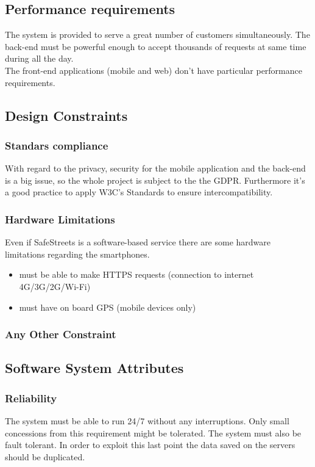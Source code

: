 \documentclass{article}
\begin{document}
\newpage
\subsection{Performance requirements}
The system is provided to serve a great number of customers simultaneously. The
back-end must be powerful enough to accept thousands of requests at same time
during all the day.\\
The front-end applications (mobile and web) don't have particular performance
requirements.
\subsection{Design Constraints}
\subsubsection{Standars compliance}
With regard to the privacy, security for the mobile application and the back-end
is a big issue, so the whole project is subject to the the GDPR. Furthermore
it's a good practice to apply W3C's Standards to ensure intercompatibility.
\subsubsection{Hardware Limitations}
Even if SafeStreets is a software-based service there are some hardware
limitations regarding the smartphones.
\begin{itemize}
    \item must be able to make HTTPS requests (connection to internet
    4G/3G/2G/Wi-Fi)
    \item must have on board GPS (mobile devices only)
\end{itemize}
\subsubsection{Any Other Constraint}
\subsection{Software System Attributes}
\subsubsection{Reliability}
The system must be able to run 24/7 without any interruptions. Only small
concessions from this requirement might be tolerated. The system must also be
fault tolerant. In order to exploit this last point the data saved on the
servers should be duplicated.
\end{document}
